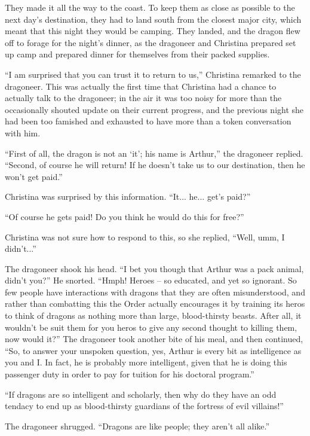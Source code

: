 \documentclass[showtrims,b6paper,draft,10pt]{memoir}
\begin{document}
They made it all the way to the coast.  To keep them as close as possible to the next day's destination, they had to land south from the closest major city, which meant that this night they would be camping.  They landed, and the dragon flew off to forage for the night's dinner, as the dragoneer and Christina prepared set up camp and prepared dinner for themselves from their packed supplies.

``I am surprised that you can trust it to return to us,''  Christina remarked to the dragoneer.  This was actually the first time that Christina had a chance to actually talk to the dragoneer;  in the air it was too noisy for more than the occasionally shouted update on their current progress, and the previous night she had been too famished and exhausted to have more than a token conversation with him.

``First of all, the dragon is not an `it';  his name is Arthur,'' the dragoneer replied.  ``Second, of course he will return!  If he doesn't take us to our destination, then he won't get paid.''

Christina was surprised by this information.  ``It... he... get's paid?''

``Of course he gets paid!  Do you think he would do this for free?''

Christina was not sure how to respond to this, so she replied, ``Well, umm, I didn't...''

The dragoneer shook his head.  ``I bet you though that Arthur was a pack animal, didn't you?''   He snorted.  ``Hmph!  Heroes -- so educated, and yet so ignorant.  So few people have interactions with dragons that they are often misunderstood, and rather than combatting this the Order actually encourages it by training its heros to think of dragons as nothing more than  large, blood-thirsty beasts.  After all, it wouldn't be suit them for you heros to give any second thought to killing them, now would it?''  The dragoneer took another bite of his meal, and then continued,  ``So, to answer your unspoken question, yes, Arthur is every bit as intelligence as you and I.  In fact, he is probably more intelligent, given that he is doing this passenger duty in order to pay for tuition for his doctoral program.''

``If dragons are so intelligent and scholarly, then why do they have an odd tendacy to end up as blood-thirsty guardians of the fortress of evil villains!''

The dragoneer shrugged.  ``Dragons are like people;  they aren't all alike.''
\end{document}
